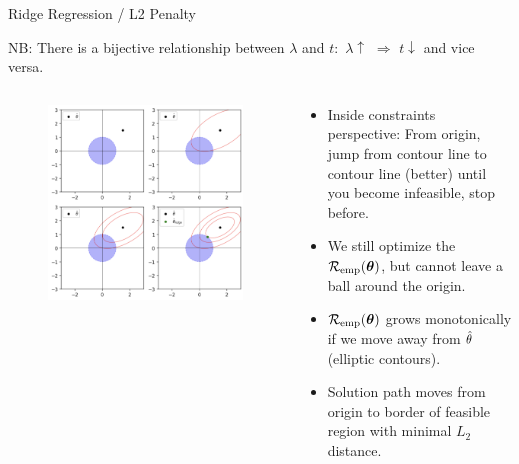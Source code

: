 \documentclass[11pt,compress,t,notes=noshow, xcolor=table]{beamer}
\begin{document}
\begin{vbframe}{Ridge Regression / L2 Penalty}
\begin{footnotesize} 
NB: There is a bijective relationship between $\lambda$ and $t$: $\, \lambda \uparrow \,\, \Rightarrow \,\, t \downarrow$ and vice versa.
\end{footnotesize}

\framebreak

\begin{columns}
\begin{column}{0.5\textwidth}
\lz
\begin{figure}
\includegraphics[width=\textwidth]{figure/ridge_inside.png}
\end{figure}
\end{column}

\begin{column}{0.5\textwidth}
\begin{footnotesize} 
\lz \lz
\begin{itemize}
  \item Inside constraints perspective: From origin, jump from contour line to contour line (better) until you become infeasible, stop before.
  \item We still optimize the $\mathcal{R}_{\text{emp}}(\bm{\theta})$, but cannot leave a ball around the origin.
  \item $\mathcal{R}_{\text{emp}}(\bm{\theta})$ grows monotonically if we move away from $\hat{\theta}$ (elliptic contours).
  \item Solution path moves from origin to border of feasible region with minimal $L_2$ distance.
\end{itemize}
\end{footnotesize}
\end{column}
\end{columns}



\end{vbframe}
\end{document}
